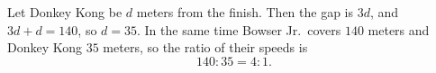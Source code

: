 Let Donkey Kong be $d$ meters from the finish. Then the gap is $3d$, and $3d+d=140$, so $d=35$. In the same time Bowser Jr.\ covers $140$ meters and Donkey Kong $35$ meters, so the ratio of their speeds is
\[
140:35=\boxed{4:1}.
\]

